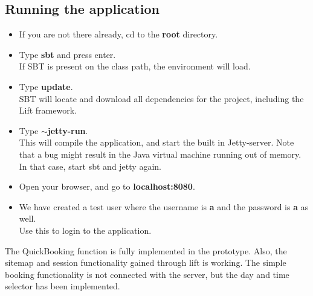 \subsection{Running the application}
\begin{itemize}
	\item If you are not there already, cd to the \textbf{root} directory.
	\item Type \textbf{sbt} and press enter.\\If SBT is present on the class path, the environment will load. 
	\item Type \textbf{update}.\\SBT will locate and download all dependencies for the 					project, including the Lift framework.
	\item Type \textbf{$\sim$jetty-run}.\\This will compile the application, and start the built in Jetty-server. Note that a bug might result in the Java virtual machine running out of memory. In that case, start sbt and jetty again.
	\item Open your browser, and go to \textbf{localhost:8080}.
	\item We have created a test user where the username is \textbf{a} and the password is \textbf{a} as well.\\ Use this to login to the application.
\end{itemize}

The QuickBooking function is fully implemented in the prototype. Also, the sitemap and session functionality gained through lift is working. The simple booking functionality is not connected with the server, but the day and time selector has been implemented.

